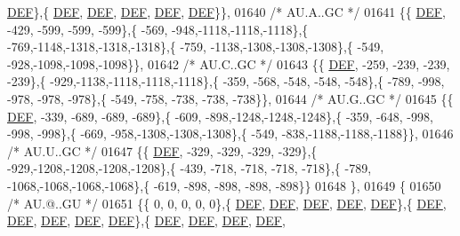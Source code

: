\begin{DoxyCode}
      \mbox{\hyperlink{1_88_84__epars_8h_a397419fc12b37ed479c8abb9d444d843}{DEF}}\},\{  \mbox{\hyperlink{1_88_84__epars_8h_a397419fc12b37ed479c8abb9d444d843}{DEF}},  \mbox{\hyperlink{1_88_84__epars_8h_a397419fc12b37ed479c8abb9d444d843}{DEF}},  \mbox{\hyperlink{1_88_84__epars_8h_a397419fc12b37ed479c8abb9d444d843}{DEF}},  \mbox{\hyperlink{1_88_84__epars_8h_a397419fc12b37ed479c8abb9d444d843}{DEF}},  \mbox{\hyperlink{1_88_84__epars_8h_a397419fc12b37ed479c8abb9d444d843}{DEF}}\}\},
01640 \textcolor{comment}{/* AU.A..GC */}
01641 \{\{  \mbox{\hyperlink{1_88_84__epars_8h_a397419fc12b37ed479c8abb9d444d843}{DEF}}, -429, -599, -599, -599\},\{ -569, -948,-1118,-1118,-1118\},\{ -769,-1148,-1318,-1318,-1318\},\{ -759,
      -1138,-1308,-1308,-1308\},\{ -549, -928,-1098,-1098,-1098\}\},
01642 \textcolor{comment}{/* AU.C..GC */}
01643 \{\{  \mbox{\hyperlink{1_88_84__epars_8h_a397419fc12b37ed479c8abb9d444d843}{DEF}}, -259, -239, -239, -239\},\{ -929,-1138,-1118,-1118,-1118\},\{ -359, -568, -548, -548, -548\},\{ -789,
       -998, -978, -978, -978\},\{ -549, -758, -738, -738, -738\}\},
01644 \textcolor{comment}{/* AU.G..GC */}
01645 \{\{  \mbox{\hyperlink{1_88_84__epars_8h_a397419fc12b37ed479c8abb9d444d843}{DEF}}, -339, -689, -689, -689\},\{ -609, -898,-1248,-1248,-1248\},\{ -359, -648, -998, -998, -998\},\{ -669,
       -958,-1308,-1308,-1308\},\{ -549, -838,-1188,-1188,-1188\}\},
01646 \textcolor{comment}{/* AU.U..GC */}
01647 \{\{  \mbox{\hyperlink{1_88_84__epars_8h_a397419fc12b37ed479c8abb9d444d843}{DEF}}, -329, -329, -329, -329\},\{ -929,-1208,-1208,-1208,-1208\},\{ -439, -718, -718, -718, -718\},\{ -789,
      -1068,-1068,-1068,-1068\},\{ -619, -898, -898, -898, -898\}\}
01648 \},
01649 \{
01650 \textcolor{comment}{/* AU.@..GU */}
01651 \{\{    0,    0,    0,    0,    0\},\{  \mbox{\hyperlink{1_88_84__epars_8h_a397419fc12b37ed479c8abb9d444d843}{DEF}},  \mbox{\hyperlink{1_88_84__epars_8h_a397419fc12b37ed479c8abb9d444d843}{DEF}},  \mbox{\hyperlink{1_88_84__epars_8h_a397419fc12b37ed479c8abb9d444d843}{DEF}},  \mbox{\hyperlink{1_88_84__epars_8h_a397419fc12b37ed479c8abb9d444d843}{DEF}},  \mbox{\hyperlink{1_88_84__epars_8h_a397419fc12b37ed479c8abb9d444d843}{DEF}}\},\{  
      \mbox{\hyperlink{1_88_84__epars_8h_a397419fc12b37ed479c8abb9d444d843}{DEF}},  \mbox{\hyperlink{1_88_84__epars_8h_a397419fc12b37ed479c8abb9d444d843}{DEF}},  \mbox{\hyperlink{1_88_84__epars_8h_a397419fc12b37ed479c8abb9d444d843}{DEF}},  \mbox{\hyperlink{1_88_84__epars_8h_a397419fc12b37ed479c8abb9d444d843}{DEF}},  \mbox{\hyperlink{1_88_84__epars_8h_a397419fc12b37ed479c8abb9d444d843}{DEF}}\},\{  \mbox{\hyperlink{1_88_84__epars_8h_a397419fc12b37ed479c8abb9d444d843}{DEF}},  \mbox{\hyperlink{1_88_84__epars_8h_a397419fc12b37ed479c8abb9d444d843}{DEF}},  \mbox{\hyperlink{1_88_84__epars_8h_a397419fc12b37ed479c8abb9d444d843}{DEF}},  \mbox{\hyperlink{1_88_84__epars_8h_a397419fc12b37ed479c8abb9d444d843}{DEF}},  

\end{DoxyCode}

